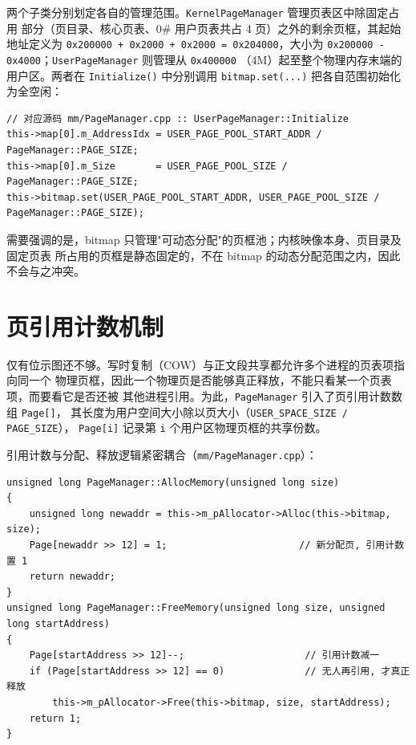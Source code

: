 两个子类分别划定各自的管理范围。\texttt{KernelPageManager} 管理页表区中除固定占用
部分（页目录、核心页表、0\# 用户页表共占 4 页）之外的剩余页框，其起始地址定义为
\texttt{0x200000 + 0x2000 + 0x2000 = 0x204000}，大小为
\texttt{0x200000 - 0x4000}；\texttt{UserPageManager} 则管理从 \texttt{0x400000}
（4M）起至整个物理内存末端的用户区。两者在 \texttt{Initialize()} 中分别调用
\texttt{bitmap.set(...)} 把各自范围初始化为全空闲：

\begin{lstlisting}[caption={用户页框池的位示图初始化},label={lst:user-pm-init}]
// 对应源码 mm/PageManager.cpp :: UserPageManager::Initialize
this->map[0].m_AddressIdx = USER_PAGE_POOL_START_ADDR / PageManager::PAGE_SIZE;
this->map[0].m_Size       = USER_PAGE_POOL_SIZE / PageManager::PAGE_SIZE;
this->bitmap.set(USER_PAGE_POOL_START_ADDR, USER_PAGE_POOL_SIZE / PageManager::PAGE_SIZE);
\end{lstlisting}

需要强调的是，bitmap 只管理"可动态分配"的页框池；内核映像本身、页目录及固定页表
所占用的页框是静态固定的，不在 bitmap 的动态分配范围之内，因此不会与之冲突。

\section{页引用计数机制}
仅有位示图还不够。写时复制（COW）与正文段共享都允许多个进程的页表项指向同一个
物理页框，因此一个物理页是否能够真正释放，不能只看某一个页表项，而要看它是否还被
其他进程引用。为此，\texttt{PageManager} 引入了页引用计数数组 \texttt{Page[]}，
其长度为用户空间大小除以页大小（\texttt{USER\_SPACE\_SIZE / PAGE\_SIZE}），
\texttt{Page[i]} 记录第 \texttt{i} 个用户区物理页框的共享份数。

引用计数与分配、释放逻辑紧密耦合（\texttt{mm/PageManager.cpp}）：

\begin{lstlisting}[caption={带引用计数的分配与释放},label={lst:page-refcount}]
unsigned long PageManager::AllocMemory(unsigned long size)
{
    unsigned long newaddr = this->m_pAllocator->Alloc(this->bitmap, size);
    Page[newaddr >> 12] = 1;                       // 新分配页, 引用计数置 1
    return newaddr;
}
unsigned long PageManager::FreeMemory(unsigned long size, unsigned long startAddress)
{
    Page[startAddress >> 12]--;                     // 引用计数减一
    if (Page[startAddress >> 12] == 0)              // 无人再引用, 才真正释放
        this->m_pAllocator->Free(this->bitmap, size, startAddress);
    return 1;
}
\end{lstlisting}

